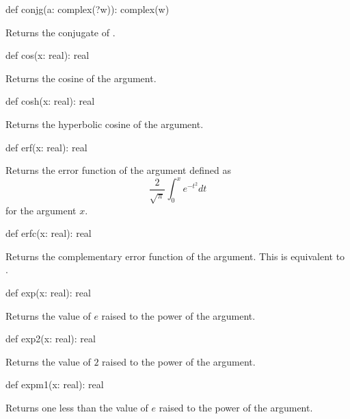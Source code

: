 \begin{protohead}
def conjg(a: complex(?w)): complex(w)
\end{protohead}
\begin{protobody}
Returns the conjugate of .
\end{protobody}

\begin{protohead}
def cos(x: real): real
\end{protohead}
\begin{protobody}
Returns the cosine of the argument.
\end{protobody}

\begin{protohead}
def cosh(x: real): real
\end{protohead}
\begin{protobody}
Returns the hyperbolic cosine of the argument.
\end{protobody}

\begin{protohead}
def erf(x: real): real
\end{protohead}
\begin{protobody}
Returns the error function of the argument defined as
$$\frac{2}{\sqrt{\pi}}\int^x_0e^{-t^2}dt$$
for the argument $x$.
\end{protobody}

\begin{protohead}
def erfc(x: real): real
\end{protohead}
\begin{protobody}
Returns the complementary error function of the argument.  This is
equivalent to .
\end{protobody}

\begin{protohead}
def exp(x: real): real
\end{protohead}
\begin{protobody}
Returns the value of $e$ raised to the power of the argument.
\end{protobody}

\begin{protohead}
def exp2(x: real): real
\end{protohead}
\begin{protobody}
Returns the value of $2$ raised to the power of the argument.
\end{protobody}

\begin{protohead}
def expm1(x: real): real
\end{protohead}
\begin{protobody}
Returns one less than the value of $e$ raised to the power of the argument.
\end{protobody}

